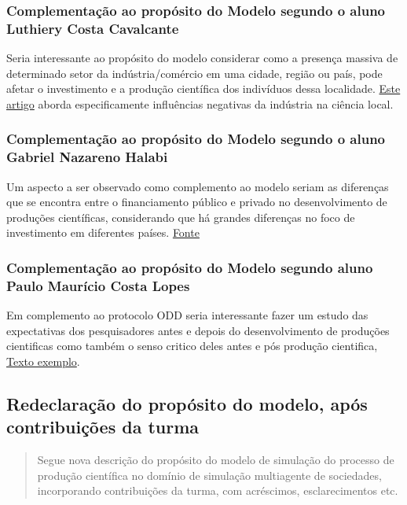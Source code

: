 \subsubsection{Complementação ao propósito do Modelo segundo o aluno Luthiery Costa Cavalcante}
Seria interessante ao propósito do modelo considerar como a presença massiva de determinado setor da indústria/comércio em uma cidade, região ou país, pode afetar o investimento e a produção científica dos indivíduos dessa localidade. \href{https://www.scielo.br/j/ss/a/FgDGxNb9L74g4fMch8kqM5F/?lang=pt}{Este artigo} aborda especificamente influências negativas da indústria na ciência local.

\subsubsection{Complementação ao propósito do Modelo segundo o aluno Gabriel Nazareno Halabi}
Um aspecto a ser observado como complemento ao modelo seriam as diferenças que se encontra entre o financiamento público e privado no desenvolvimento de produções científicas, considerando que há grandes diferenças no foco de investimento em diferentes países. \href{https://www.scielo.br/j/ep/a/WgdZnSMrX49LLTJMffmsqNK/?lang=pt}{Fonte}

\subsubsection{Complementação ao propósito do Modelo segundo aluno Paulo Maurício Costa Lopes}
Em complemento ao protocolo ODD seria interessante fazer um estudo das expectativas dos pesquisadores antes e depois do desenvolvimento de produções cientificas como também o senso critico deles antes e pós produção cientifica, \href{ https://noticias.unb.br/publicacoes/67-ensino/1938-iniciacao-cientifica-da-unb-e-premiada}{Texto exemplo}. 


\subsection{Redeclaração do propósito do modelo, após contribuições da turma}\label{sec:proposito:contrib}

\begin{quote}
    Segue nova descrição do propósito do modelo de simulação do processo de produção científica no domínio de simulação multiagente de sociedades, incorporando contribuições da turma, com acréscimos, esclarecimentos etc.
\end{quote}

